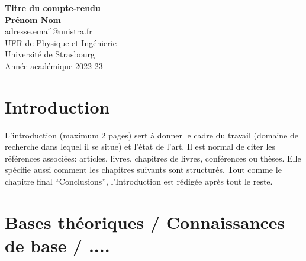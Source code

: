 \documentclass[11pt,a4paper]{report}
\begin{document}
 

\begin{titlepage}
\begin{center}
{\huge\bfseries Titre du compte-rendu} \\
\vspace{1.5cm}
{\Large\bfseries Prénom Nom}\\[5pt]
adresse.email@unistra.fr\\[14pt]
\vfill
UFR de Physique et Ingénierie \\[14pt]
Université de Strasbourg\\[14pt]
Année académique 2022-23
\end{center}
\end{titlepage}


\newpage
\onehalfspacing

\begin{abstract}
  Résume (maximum 1/2 page) du travail effectue (contexte, résultats).
\end{abstract}


\setcounter{page}{3}
\tableofcontents


\chapter*{Introduction}

L'introduction (maximum 2 pages) sert à donner le cadre du travail
(domaine de recherche dans lequel il se situe) et l'état de l'art. Il est normal de citer les références associées: articles\cite{Article01}, livres\cite{Livre01}, chapitres de livres\cite{Chapitre01}, conférences\cite{Proceeding01} ou thèses\cite{These01}.
Elle spécifie aussi comment les chapitres suivants sont structurés.
Tout comme le chapitre final ``Conclusions'', l'Introduction est
rédigée après tout le reste.



\chapter{Bases théoriques / Connaissances de base / ....}
\end{document}
